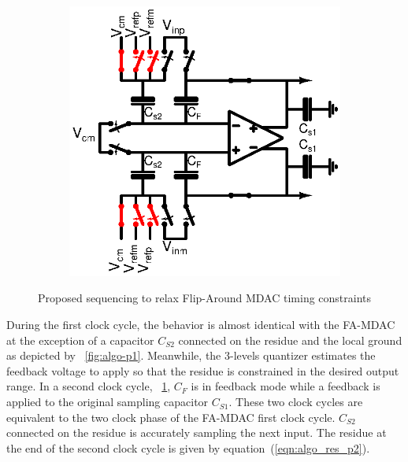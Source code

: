 \begin{figure}[htp]
\begin{subfigure}[b]{0.32\textwidth}
		\label{fig:algo-p2}
	\end{subfigure}
	\begin{subfigure}[b]{0.32\textwidth}
		\centering
		\includegraphics[width=\textwidth]{Chapter4/Figs/algorithmic-mdac-p3.ps}
		\label{fig:algo-p3}
	\end{subfigure}
	\caption{Proposed sequencing to relax Flip-Around MDAC timing constraints}
	\label{fig:algo-seq-proposed}
\end{figure}

During the first clock cycle, the behavior is almost identical with the FA-MDAC at the exception of a capacitor \(C_{S2}\) connected on the residue and the local ground as depicted by \figurename~\ref{fig:algo-p1}. Meanwhile, the 3-levels quantizer estimates the feedback voltage to apply so that the residue is constrained in the desired output range. In a second clock cycle, \figurename~\ref{fig:algo-p2}, \(C_F\) is in feedback mode while a feedback is applied to the original sampling capacitor \(C_{S1}\). These two clock cycles are equivalent to the two clock phase of the FA-MDAC first clock cycle. \(C_{S2}\) connected on the residue is accurately sampling the next input. The residue at the end of the second clock cycle is given by equation~(\ref{eqn:algo_res_p2}).

